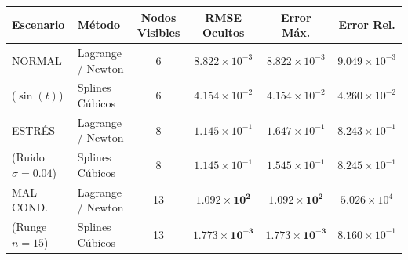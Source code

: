 \documentclass[11pt,a4paper]{article}
\begin{document}
\begin{table}[h!]
\centering
\small
\begin{tabular}{llcccc}
\toprule
\textbf{Escenario} & \textbf{Método} & \textbf{Nodos Visibles} & \textbf{RMSE Ocultos} & \textbf{Error Máx.} & \textbf{Error Rel.} \\
\midrule
NORMAL & Lagrange / Newton & 6 & $8.822\times 10^{-3}$ & $8.822\times 10^{-3}$ & $9.049\times 10^{-3}$ \\
($\sin(t)$) & Splines Cúbicos & 6 & $4.154\times 10^{-2}$ & $4.154\times 10^{-2}$ & $4.260\times 10^{-2}$ \\
\midrule
ESTRÉS & Lagrange / Newton & 8 & $1.145\times 10^{-1}$ & $1.647\times 10^{-1}$ & $8.243\times 10^{-1}$ \\
(Ruido $\sigma=0.04$) & Splines Cúbicos & 8 & $1.145\times 10^{-1}$ & $1.545\times 10^{-1}$ & $8.245\times 10^{-1}$ \\
\midrule
MAL COND. & Lagrange / Newton & 13 & $\mathbf{1.092\times 10^{2}}$ & $\mathbf{1.092\times 10^{2}}$ & $5.026\times 10^{4}$ \\
(Runge $n=15$) & Splines Cúbicos & 13 & $\mathbf{1.773\times 10^{-3}}$ & $\mathbf{1.773\times 10^{-3}}$ & $8.160\times 10^{-1}$ \\
\bottomrule
\end{tabular}
\end{table}
\end{document}
